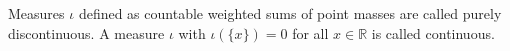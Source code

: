 Measures $\iota$ defined as countable weighted sums of point masses are called purely discontinuous. A measure $\iota$ with $\iota(\{x\}) = 0$ for all $x \in \mathbb{R}$ is called continuous.
